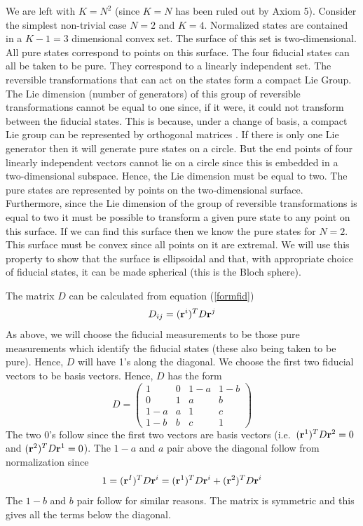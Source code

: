 \documentclass[12pt]{article}
\begin{document}
We are left with $K=N^2$ (since $K=N$ has been ruled out by Axiom 5).
Consider the simplest non-trivial case $N=2$ and $K=4$.  Normalized
states are contained in a $K-1=3$ dimensional convex set.  The surface
of this set is two-dimensional.  All pure states correspond to points on
this surface.  The four fiducial states can all be taken to be pure.  They
correspond to a linearly independent set.
The reversible transformations that can act on the states form a
compact Lie Group.  The Lie dimension (number of generators) of this
group of reversible transformations cannot be equal to one since, if
it were, it could not transform between the fiducial states. This is because,
under a change
of basis, a compact Lie group can be represented by
orthogonal matrices \cite{boerner}. If there
is only one Lie generator then it will generate pure states on a circle.  But
the end points of four linearly independent vectors cannot lie on a
circle since this is embedded in a two-dimensional subspace.  Hence, the
Lie dimension must be equal to two.  The pure states are
represented by points on the two-dimensional surface.  Furthermore,
since the Lie
dimension of the group of reversible transformations is equal to two
it must be possible to
transform a given pure state to any point on this surface.  If we can
find this surface then we know the pure states for $N=2$.  This surface
must be convex since all points on it are extremal.  We will use this
property to show that the surface is ellipsoidal and that, with
appropriate choice of fiducial states, it can be made spherical (this is
the Bloch sphere).

The matrix $D$ can be calculated from equation (\ref{formfid})
\[ D_{ij}= ({\bf r}^i)^T D {\bf r}^j  \]
As above, we will choose the fiducial measurements to be those pure
measurements which identify the fiducial
states (these also being taken to be pure).  Hence, $D$ will have 1's along
the diagonal.  We choose the first two fiducial vectors to be basis
vectors.  Hence, $D$ has the form
\begin{equation}\label{twodDsym}
D=\left( \begin{array}{cccc} 1 &  0  &  1-a & 1-b \\
                             0 &  1  &   a  &  b  \\
                             1-a &  a &   1  &  c  \\
                             1-b &  b &   c &  1   \end{array} \right)
\end{equation}
The two 0's follow since the first two vectors are basis vectors (i.e.\
$({\bf r}^1)^T D {\bf r}^2=0$ and $({\bf r}^2)^T D {\bf r}^1=0$).  The
$1-a$ and $a$ pair above the diagonal follow from normalization since
\begin{equation}
1=({\bf r}^I)^T D {\bf r}^i=({\bf r}^1)^T D {\bf r}^i +
({\bf r}^2)^T D {\bf r}^i
\end{equation}
The $1-b$ and $b$ pair follow for similar reasons.  The matrix is
symmetric and this gives all the terms below the diagonal.
\end{document}
